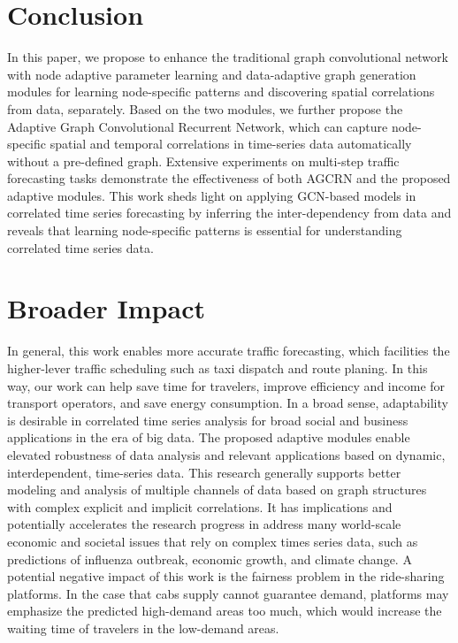 \documentclass{article}
\begin{document}
\section{Conclusion}
In this paper, we propose to enhance the traditional graph convolutional network with node adaptive parameter learning and data-adaptive graph generation modules for learning node-specific patterns and discovering spatial correlations from data, separately. Based on the two modules, we further propose the Adaptive Graph Convolutional Recurrent Network, which can capture node-specific spatial and temporal correlations in time-series data automatically without a pre-defined graph. Extensive experiments on multi-step traffic forecasting tasks demonstrate the effectiveness of both AGCRN and the proposed adaptive modules. This work sheds light on applying GCN-based models in correlated time series forecasting by inferring the inter-dependency from data and reveals that learning node-specific patterns is essential for understanding correlated time series data. 

\section*{Broader Impact}
In general, this work enables more accurate traffic forecasting, which facilities the higher-lever traffic scheduling such as taxi dispatch and route planing. In this way, our work can help save time for travelers, improve efficiency and income for transport operators, and save energy consumption. In a broad sense, adaptability is desirable in correlated time series analysis for broad social and business applications in the era of big data.
The proposed adaptive modules enable elevated robustness of data analysis and relevant applications based on dynamic, interdependent, time-series data.
This research generally supports better modeling and analysis of multiple channels of data based on graph structures with complex explicit and implicit correlations. It has implications and potentially accelerates the research progress in address many world-scale economic and societal issues that rely on complex times series data, such as predictions of influenza outbreak, economic growth, and climate change. 
A potential negative impact of this work is the fairness problem in the ride-sharing platforms. In the case that cabs supply cannot guarantee demand, platforms may emphasize the predicted high-demand areas too much, which would increase the waiting time of travelers in the low-demand areas.
\end{document}
